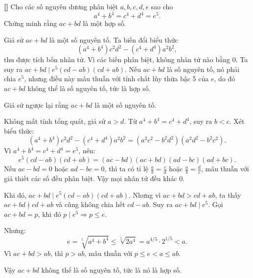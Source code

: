 \documentclass[../04-diophantine-equations.tex]{subfiles}
\begin{document}
\begin{example*}\label{example:USA-2015-MO-P5}\textbf{[]}
	Cho các số nguyên dương phân biệt \( a, b, c, d, e \) sao cho
	\[
		a^4 + b^4 = c^4 + d^4 = e^5.
	\]
	Chứng minh rằng \( ac + bd \) là một hợp số.
\end{example*}

\begin{story*}
    Giả sử \( ac + bd \) là một số nguyên tố. Ta biến đổi biểu thức
    \[
        (a^4 + b^4)c^2d^2 - (c^4 + d^4)a^2b^2,
    \]
    thu được tích bốn nhân tử. Vì các biến phân biệt, không nhân tử nào bằng 0.  
    Ta suy ra \( ac + bd \mid e^5(cd - ab)(cd + ab) \). Nếu \( ac + bd \) là số nguyên tố, nó phải chia \( e^5 \), nhưng điều này mâu thuẫn với tính chất lũy thừa bậc 5 của \( e \), do đó \( ac + bd \) không thể là số nguyên tố, tức là hợp số.
\end{story*}

\bigbreak

\begin{soln}\footnotemark
    Giả sử ngược lại rằng \(ac + bd\) là một số nguyên tố.

    Không mất tính tổng quát, giả sử \(a > d\). Từ \(a^4 + b^4 = c^4 + d^4\), suy ra \(b < c\).  
    Xét biểu thức:
    \[
        (a^4 + b^4)c^2d^2 - (c^4 + d^4)a^2b^2
        = (a^2c^2 - b^2d^2)(a^2d^2 - b^2c^2).
    \]
    Vì \(a^4 + b^4 = c^4 + d^4 = e^5\), nên:
    \[
        e^5(cd - ab)(cd + ab) 
        = (ac - bd)(ac + bd)(ad - bc)(ad + bc).
    \]
    Nếu \(ac - bd = 0\) hoặc \(ad - bc = 0\), thì ta có tỉ lệ \(\tfrac{a}{b} = \tfrac{c}{d}\) hoặc \(\tfrac{a}{b} = \tfrac{d}{c}\), mâu thuẫn với giả thiết các số đều phân biệt.  
    Vậy mọi nhân tử đều khác 0.

    Khi đó, \( ac + bd \mid e^5(cd - ab)(cd + ab) \).  
    Nhưng vì \( ac + bd > cd + ab \), ta thấy \( ac + bd \nmid cd + ab \) và cũng không chia hết \( cd - ab \).  
    Suy ra \( ac + bd \mid e^5 \). Gọi \( ac + bd = p \), khi đó \( p \mid e^5 \Rightarrow p \le e \).  

    Nhưng:
    \[
        e = \sqrt[5]{a^4 + b^4} \le \sqrt[5]{2a^4} = a^{4/5} \cdot 2^{1/5} < a.
    \]
    Vì \( ac + bd > ab \), thì \( p > ab \), mâu thuẫn với \( p \le e < a \le ab \).  

    Vậy \( ac + bd \) không thể là số nguyên tố, tức là nó là hợp số.
\end{soln}

\end{document}
